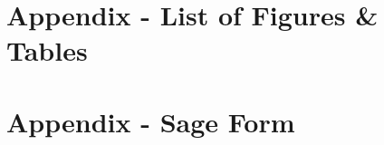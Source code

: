 \printbibliography

\appendix

\section{Appendix - List of Figures \& Tables}
\listoffigures
\listoftables
\newpage

\section{Appendix - Sage Form}
\label{subsec:Sage_Form}


